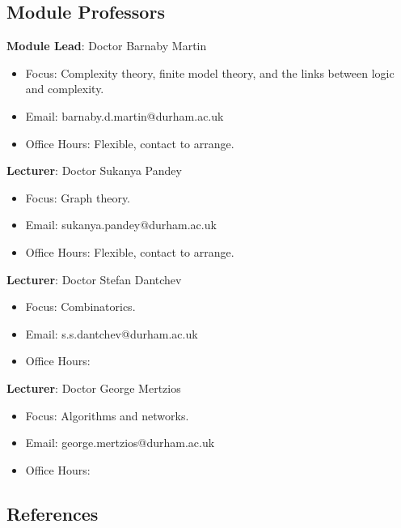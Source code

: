 \subsection{Module Professors}

\textbf{Module Lead}: Doctor Barnaby Martin

\begin{itemize}\label{modulelead-barnabymartin}
    \item Focus: Complexity theory, finite model theory, and the links between logic and complexity.
    \item Email: barnaby.d.martin@durham.ac.uk
    \item Office Hours: Flexible, contact to arrange.
\end{itemize}

\textbf{Lecturer}: Doctor Sukanya Pandey

\begin{itemize}\label{lecturer-toc-sukanyapandey}
    \item Focus: Graph theory.
    \item Email: sukanya.pandey@durham.ac.uk
    \item Office Hours: Flexible, contact to arrange.
\end{itemize}

\textbf{Lecturer}: Doctor Stefan Dantchev

\begin{itemize}\label{lecturer-stefandantchev}
    \item Focus: Combinatorics.
    \item Email: s.s.dantchev@durham.ac.uk
    \item Office Hours: 
\end{itemize}

\textbf{Lecturer}: Doctor George Mertzios

\begin{itemize}\label{lecturer-georgemertzios}
    \item Focus: Algorithms and networks.
    \item Email: george.mertzios@durham.ac.uk
    \item Office Hours: 
\end{itemize}

\subsection{References}

